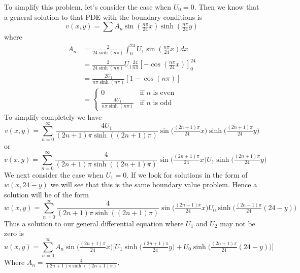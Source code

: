\documentclass[12pt]{article}
\begin{document}
	To simplify this problem, let's consider the case when $U_0 = 0$. Then we know that a general solution to that PDE with the boundary conditions is 
	$$
	v(x,y) = \sum A_n \sin(\tfrac{n\pi}{24}x)\sinh(\tfrac{n\pi}{24}y)
	$$
	where
	\begin{align*}
		A_n & = \tfrac{2}{24\sinh(n\pi)} \int_0^{24} U_1 \sin(\tfrac{n\pi}{24}x) dx \\
		& = \tfrac{2}{24\sinh(n\pi)} U_1 \tfrac{24}{n\pi} [-\cos(\tfrac{n\pi}{24}x)]_0^{24} \\
		& = \frac{2U_1}{n\pi\sinh(n\pi)} [1 - \cos(n\pi)] \\
		& = \begin{cases}
				0 & \text{if $n$ is even} \\
				\tfrac{4U_1}{n\pi\sinh(n\pi)} & \text{if $n$ is odd}
		\end{cases}
	\end{align*}
	To simplify completely we have
	$$
	v(x,y) = \sum_{n=0}^\infty \frac{4U_1}{(2n+1)\pi\sinh((2n+1)\pi)} \sin \Big(\tfrac{(2n+1)\pi}{24}x \Big)\sinh \Big(\tfrac{(2n+1)\pi}{24}y \Big)
	$$
	or
	$$
	v(x,y) = \sum_{n=0}^\infty \frac{4}{(2n+1)\pi\sinh((2n+1)\pi)} \sin \Big(\tfrac{(2n+1)\pi}{24}x \Big) U_1 \sinh \Big(\tfrac{(2n+1)\pi}{24}y \Big)
	$$
	We next consider the case when $U_1=0$. If we look for solutions in the form of $w(x, 24-y)$ we will see that this is the same boundary value problem. Hence a solution will be of the form
	$$
	w(x,y) = \sum_{n=0}^\infty \frac{4}{(2n+1)\pi\sinh((2n+1)\pi)} \sin \Big(\tfrac{(2n+1)\pi}{24}x \Big) U_0 \sinh \Big(\tfrac{(2n+1)\pi}{24}(24-y) \Big)
	$$
	Thus a solution to our general differential equation where $U_1$ and $U_2$ may not be zero is
	$$
	u(x,y) = \sum_{n=0}^\infty A_n \sin \Big(\tfrac{(2n+1)\pi}{24}x \Big) 
	\Big[ U_1 \sinh \Big(\tfrac{(2n+1)\pi}{24}y \Big) + U_0 \sinh \Big(\tfrac{(2n+1)\pi}{24}(24-y) \Big) \Big ]
	$$
	Where $A_n = \frac{4}{(2n+1)\pi\sinh((2n+1)\pi)}$.

	
\end{document}
